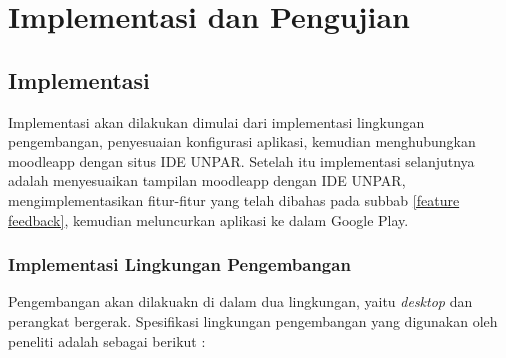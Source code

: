 \chapter{Implementasi dan Pengujian}

\section{Implementasi}

Implementasi akan dilakukan dimulai dari implementasi lingkungan pengembangan, penyesuaian konfigurasi aplikasi, kemudian menghubungkan moodleapp dengan situs IDE UNPAR. Setelah itu implementasi selanjutnya adalah menyesuaikan tampilan moodleapp  dengan IDE UNPAR, mengimplementasikan fitur-fitur yang telah dibahas pada subbab \ref {feature feedback}, kemudian meluncurkan aplikasi ke dalam Google Play. 

\subsection{Implementasi Lingkungan Pengembangan}
Pengembangan akan dilakuakn di dalam dua lingkungan, yaitu \textit{desktop} dan perangkat bergerak. Spesifikasi lingkungan pengembangan yang digunakan oleh peneliti adalah sebagai berikut :

